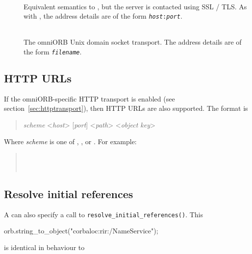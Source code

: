 \documentclass[11pt,oneside,a4paper]{book}
\newcommand{\code}[1]{\texttt{#1}}
\newcommand{\op}[1]{\texttt{#1()}}
\begin{document}
\begin{description}

\item[]\mbox{}\\
Equivalent semantics to , but the server is contacted
using SSL / TLS. As with , the address details are of
the form \code{\textit{host}:\textit{port}}.

\item[]\mbox{}\\
The omniORB Unix domain socket transport. The address details are of
the form \code{\textit{filename}}.

\end{description}


\subsection{HTTP URLs}

If the omniORB-specific HTTP transport is enabled (see
section~\ref{sec:httptransport}), then HTTP URLs are also
supported. The format is

\begin{quote}
\textit{scheme}%
\corbauri{://}%
<\textit{host}>%
[\corbauri{:}\textit{port}]%
\corbauri{/}%
<\textit{path}>%
\corbauri{#}%
<\textit{object key}>
\end{quote}

\noindent Where \textit{scheme} is one of ,
,  or . For example:

\begin{quote}
\\
\\
\end{quote}


\subsection{Resolve initial references}

A  can also specify a call to
\op{resolve\_initial\_references}. This

\begin{pylisting}
orb.string_to_object("corbaloc:rir:/NameService");
\end{pylisting}

\noindent is identical in behaviour to
\end{document}
